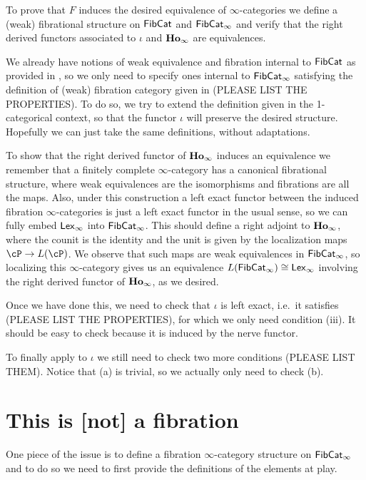 \documentclass[a4paper,12pt]{scrartcl}
\begin{document}
To prove that $F$ induces the desired equivalence of $\infty$-categories we
define a (weak) fibrational structure on $\operatorname{\mathsf{FibCat}}$ and $\operatorname{\mathsf{FibCat}}_\infty$ and
verify that the right derived functors associated to $\iota$ and
$\operatorname{\mathbf{Ho}_\infty}$ are equivalences.

We already have notions of weak equivalence and fibration
internal to $\operatorname{\mathsf{FibCat}}$ as provided in \cite{KS19}, so we only need to specify
ones internal to $\operatorname{\mathsf{FibCat}}_\infty$ satisfying the definition of (weak)
fibration category given in \cite[Def.\ 7.4.12]{Cis19} (PLEASE LIST THE
PROPERTIES). To do so, we try to extend the definition given in the
1-categorical context, so that the functor $\iota$ will preserve the desired
structure. Hopefully we can just take the same definitions, without adaptations.

To show that the right derived functor of $\operatorname{\mathbf{Ho}_\infty}$ induces an equivalence we
remember that a finitely
complete $\infty$-category has a canonical fibrational structure, where weak
equivalences are the isomorphisms and fibrations are all the maps. Also, under
this construction a left exact functor between the induced fibration $\infty$-categories
is just a left exact functor in the usual sense, so we can fully embed
$\operatorname{\mathsf{Lex}_\infty}$ into $\operatorname{\mathsf{FibCat}}_\infty$. This should define a right adjoint to
$\operatorname{\mathbf{Ho}_\infty}$, where the counit is the identity and the unit is given by the
localization maps $\cP\rightarrow L(\cP)$. We observe that such maps are weak
equivalences in $\operatorname{\mathsf{FibCat}}_\infty$, so localizing this $\infty$-category gives us
an equivalence $L(\operatorname{\mathsf{FibCat}}_\infty)\cong\operatorname{\mathsf{Lex}_\infty}$ involving the right derived
functor of $\operatorname{\mathbf{Ho}_\infty}$, as we desired.

Once we have done this, we need to check that $\iota$ is left exact, i.e.\ it
satisfies \cite[Def.\ 7.5.2]{Cis19} (PLEASE LIST THE PROPERTIES), for which we
only need condition (iii). It should be easy to check because it is induced by
the nerve functor.

To finally apply \cite[Thm.\ 7.6.15]{Cis19} to $\iota$ we still need to check
two more conditions (PLEASE LIST THEM). Notice that (a) is trivial, so we
actually only need to check (b).

\section{This is [not] a fibration}

One piece of the issue is to define a fibration $\infty$-category structure on
$\operatorname{\mathsf{FibCat}}_\infty$ and to do so we need to first provide the definitions of the
elements at play.
\end{document}
